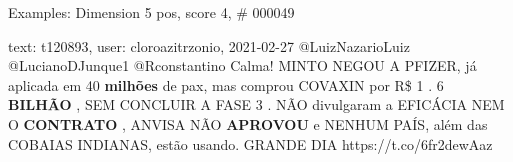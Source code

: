 \begin{frame}{Examples: Dimension 5 pos, score 4, \# 000049}
\footnotesize
\begin{exampleblock}{text: t120893, user: cloroazitrzonio, 2021-02-27}
@LuizNazarioLuiz @LucianoDJunque1 @Rconstantino Calma! MINTO NEGOU A PFIZER, já 
aplicada em 40 \textbf{milhões} de pax, mas comprou COVAXIN por R\$ 1 . 6 
\textbf{BILHÃO} , SEM CONCLUIR A FASE 3 . NÃO divulgaram a EFICÁCIA NEM O 
\textbf{CONTRATO} , ANVISA NÃO \textbf{APROVOU} e NENHUM PAÍS, além das COBAIAS 
INDIANAS, estão usando. GRANDE DIA  
https://t.co/6fr2dewAaz 
\end{exampleblock}
\end{frame}
